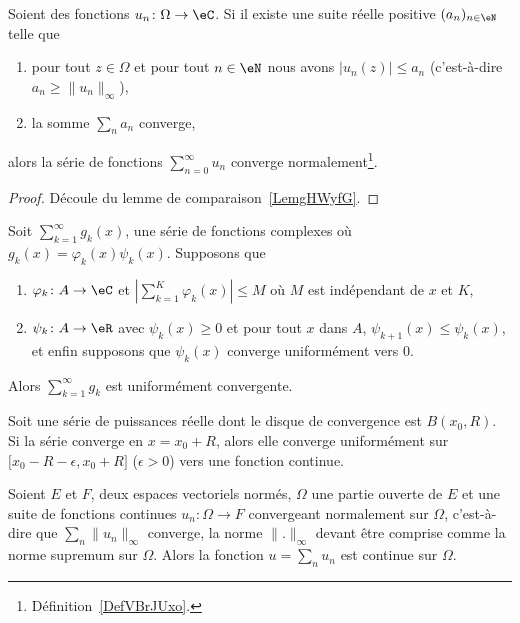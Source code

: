 \begin{lemma}
	Soient des fonctions \( u_n\colon \Omega\to \eC\). Si il existe une suite réelle positive \( (a_n)_{n\in \eN}\) telle que
	\begin{enumerate}
		\item
		      pour tout \( z\in \Omega\) et pour tout \( n\in \eN\) nous avons \( | u_n(z) |\leq a_n\) (c'est-à-dire \( a_n\geq \| u_n \|_{\infty}\)),
		\item
		      la somme \( \sum_{n}a_n\) converge,
	\end{enumerate}
	alors la série de fonctions \( \sum_{n=0}^{\infty}u_n\) converge normalement\footnote{Définition~\ref{DefVBrJUxo}.}.
\end{lemma}

\begin{proof}
	Découle du lemme de comparaison~\ref{LemgHWyfG}.
\end{proof}

\begin{theorem}				\label{ThoSerCritAbel}
	Soit \( \sum_{k=1}^{\infty}g_k(x)\), une série de fonctions complexes où \( g_k(x)=\varphi_k(x)\psi_k(x)\). Supposons que
	\begin{enumerate}

		\item
		      \( \varphi_k\colon A\to \eC\) et \( | \sum_{k=1}^K\varphi_k(x) |\leq M\) où \( M\) est indépendant de \( x\) et \( K\),
		\item
		      \( \psi_k\colon A\to \eR\) avec \( \psi_k(x)\geq 0\) et pour tout \( x\) dans \( A\), \( \psi_{k+1}(x)\leq \psi_k(x)\), et enfin supposons que \( \psi_k(x)\) converge uniformément vers \( 0\).

	\end{enumerate}
	Alors \( \sum_{k=1}^{\infty}g_k\) est uniformément convergente.
\end{theorem}

\begin{theorem}		\label{ThoAbelSeriePuiss}
	Soit une série de puissances réelle dont le disque de convergence est \( B(x_0,R)\). Si la série converge en \( x=x_0+R\), alors elle converge uniformément sur \( \mathopen[ x_0-R-\epsilon , x_0+R \mathclose]\) (\( \epsilon>0\)) vers une fonction continue.
\end{theorem}

\begin{proposition} \label{PropOMBbwst}
	Soient \( E\) et \( F\), deux espaces vectoriels normés, \( \Omega\) une partie ouverte de \( E\) et une suite de fonctions continues \( u_n\colon \Omega\to F\) convergeant normalement sur \( \Omega\), c'est-à-dire que \( \sum_n\| u_n \|_{\infty}\) converge, la norme \( \| . \|_{\infty} \) devant être comprise comme la norme supremum sur \( \Omega\). Alors la fonction \( u=\sum_nu_n\) est continue sur \( \Omega\).
\end{proposition}

